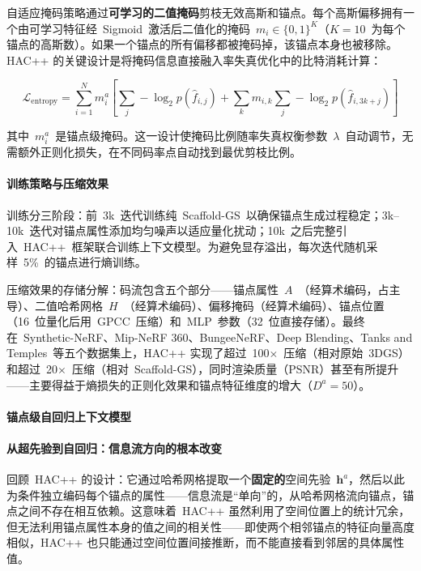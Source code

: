 自适应掩码策略通过\textbf{可学习的二值掩码}剪枝无效高斯和锚点。每个高斯偏移拥有一个由可学习特征经~Sigmoid~激活后二值化的掩码~$m_i \in \{0,1\}^K$（$K=10$~为每个锚点的高斯数）。如果一个锚点的所有偏移都被掩码掉，该锚点本身也被移除。HAC++ 的关键设计是将掩码信息直接融入率失真优化中的比特消耗计算：

\begin{equation}
\mathcal{L}_{\text{entropy}} = \sum_{i=1}^{N} m_i^a \!\left[ \sum_{j} -\log_2 p(\hat{f}_{i,j}) + \sum_{k} m_{i,k} \sum_{j} -\log_2 p(\hat{f}_{i,3k+j}) \right]
\end{equation}

其中~$m_i^a$~是锚点级掩码。这一设计使掩码比例随率失真权衡参数~$\lambda$~自动调节，无需额外正则化损失，在不同码率点自动找到最优剪枝比例。

\paragraph{训练策略与压缩效果}

训练分三阶段：前~3k~迭代训练纯~Scaffold-GS~以确保锚点生成过程稳定；3k--10k~迭代对锚点属性添加均匀噪声以适应量化扰动；10k~之后完整引入~HAC++~框架联合训练上下文模型。为避免显存溢出，每次迭代随机采样~5\%~的锚点进行熵训练。

压缩效果的存储分解：码流包含五个部分——锚点属性~$A$~（经算术编码，占主导）、二值哈希网格~$H$~（经算术编码）、偏移掩码（经算术编码）、锚点位置（16~位量化后用~GPCC~压缩）和~MLP~参数（32~位直接存储）。最终在~Synthetic-NeRF、Mip-NeRF 360、BungeeNeRF、Deep Blending、Tanks and Temples~等五个数据集上，HAC++ 实现了超过~100$\times$~压缩（相对原始~3DGS）和超过~20$\times$~压缩（相对~Scaffold-GS），同时渲染质量（PSNR）甚至有所提升——主要得益于熵损失的正则化效果和锚点特征维度的增大（$D^a=50$）。

\paragraph{锚点级自回归上下文模型}

\paragraph{从超先验到自回归：信息流方向的根本改变}

回顾~HAC++ 的设计：它通过哈希网格提取一个\textbf{固定的}空间先验~$\mathbf{h}^a$，然后以此为条件独立编码每个锚点的属性——信息流是``单向''的，从哈希网格流向锚点，锚点之间不存在相互依赖。这意味着~HAC++ 虽然利用了空间位置上的统计冗余，但无法利用锚点属性本身的值之间的相关性——即使两个相邻锚点的特征向量高度相似，HAC++ 也只能通过空间位置间接推断，而不能直接看到邻居的具体属性值。

